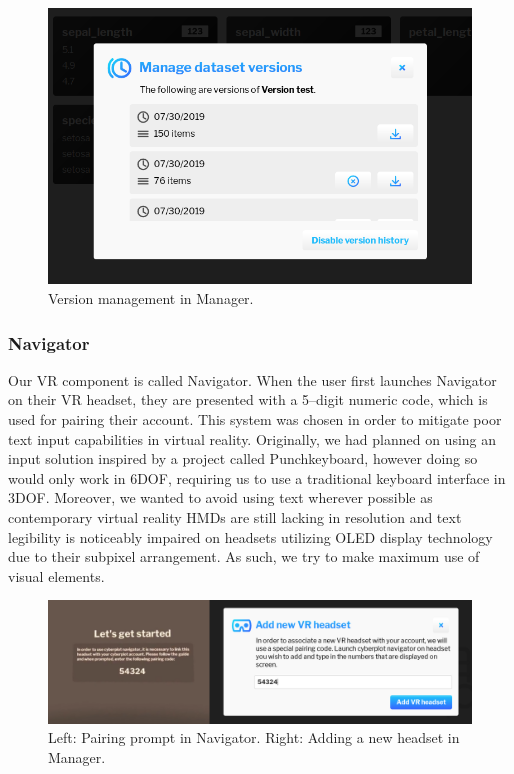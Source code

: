 \documentclass{article}
\begin{document}
\begin{figure}[!h]
\centering
\includegraphics[scale=0.35]{images/manager_versions}
\caption{Version management in Manager.}
\label{fig:managerversions}
\end{figure}

\newpage

\subsubsection{Navigator}

Our VR component is called Navigator. When the user first launches Navigator on their VR headset, they are presented with a 5--digit numeric code, which is used for pairing their account. This system was chosen in order to mitigate poor text input capabilities in virtual reality. Originally, we had planned on using an input solution inspired by a project called Punchkeyboard, however doing so would only work in 6DOF, requiring us to use a traditional keyboard interface in 3DOF.\cite{punchkeyboard} Moreover, we wanted to avoid using text wherever possible as contemporary virtual reality HMDs are still lacking in resolution and text legibility is noticeably impaired on headsets utilizing OLED display technology due to their subpixel arrangement. As such, we try to make maximum use of visual elements.\\

\begin{figure}[!h]
\centering
\includegraphics[scale=0.26]{images/pairing}
\caption{Left: Pairing prompt in Navigator. Right: Adding a new headset in Manager.}
\label{fig:pairing}
\end{figure}
\end{document}
